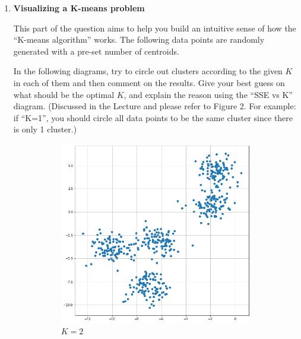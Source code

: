\documentclass[12pt]{article}
\begin{document}
\begin{enumerate}
    \item \textbf{Visualizing a K-means problem} 
    \par
    This part of the question aims to help you build an intuitive sense of how the ``K-means algorithm'' works. The following data points are randomly generated with a pre-set number of centroids. 
    \par
    In the following diagrams, try to circle out clusters according to the given $K$ in each of them and then comment on the results. Give your best guess on what should be the optimal $K$, and explain the reason using the ``SSE vs K'' diagram. (Discussed in the Lecture and please refer to Figure 2. For example: if ``K=1'', you should circle all data points to be the same cluster since there is only 1 cluster.)
\begin{figure}[!h]
     \centering
     \begin{subfigure}[b]{0.25\textwidth}
         \centering
         \includegraphics[width=\textwidth]{fig/hw2_q1.png}
         \caption{$K=2$}
         \label{fig:K2}
     \end{subfigure}
     \begin{subfigure}[b]{0.25\textwidth}
         \centering

\end{subfigure}
\end{figure}
\end{enumerate}
\end{document}
